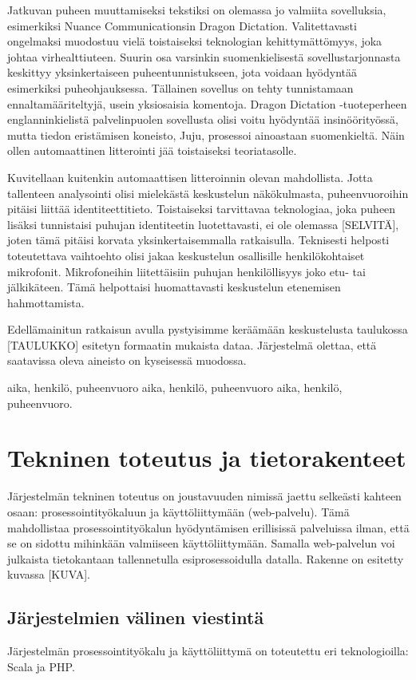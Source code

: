 \documentclass[11pt,a4paper,oneside]{memoir}
\begin{document}
Jatkuvan puheen muuttamiseksi tekstiksi on olemassa jo valmiita sovelluksia, esimerkiksi Nuance Communicationsin Dragon Dictation. Valitettavasti ongelmaksi muodostuu vielä toistaiseksi teknologian kehittymättömyys, joka johtaa  virhealttiuteen. Suurin osa varsinkin suomenkielisestä sovellustarjonnasta keskittyy yksinkertaiseen puheentunnistukseen, jota voidaan hyödyntää esimerkiksi puheohjauksessa. Tällainen sovellus on tehty tunnistamaan ennaltamääriteltyjä, usein yksiosaisia komentoja. Dragon Dictation -tuoteperheen englanninkielistä palvelinpuolen sovellusta olisi voitu hyödyntää insinöörityössä, mutta tiedon eristämisen koneisto, Juju, prosessoi ainoastaan suomenkieltä. Näin ollen automaattinen litterointi jää toistaiseksi teoriatasolle.

Kuvitellaan kuitenkin automaattisen litteroinnin olevan mahdollista. Jotta tallenteen analysointi olisi mielekästä keskustelun näkökulmasta, puheenvuoroihin pitäisi liittää identiteettitieto. Toistaiseksi tarvittavaa teknologiaa, joka puheen lisäksi tunnistaisi puhujan identiteetin luotettavasti, ei ole olemassa [SELVITÄ], joten tämä pitäisi korvata yksinkertaisemmalla ratkaisulla. Teknisesti helposti toteutettava vaihtoehto olisi jakaa keskustelun osallisille henkilökohtaiset mikrofonit. Mikrofoneihin liitettäisiin puhujan henkilöllisyys joko etu- tai jälkikäteen. Tämä helpottaisi huomattavasti keskustelun etenemisen hahmottamista.

Edellämainitun ratkaisun avulla pystyisimme keräämään keskustelusta taulukossa [TAULUKKO] esitetyn formaatin mukaista dataa. Järjestelmä olettaa, että saatavissa oleva aineisto on kyseisessä muodossa.

aika, henkilö, puheenvuoro
aika, henkilö, puheenvuoro
aika, henkilö, puheenvuoro.

\chapter{Tekninen toteutus ja tietorakenteet}
Järjestelmän tekninen toteutus on joustavuuden nimissä jaettu selkeästi kahteen osaan: prosessointityökaluun ja käyttöliittymään (web-palvelu). Tämä mahdollistaa prosessointityökalun hyödyntämisen erillisissä palveluissa ilman, että se on sidottu mihinkään valmiiseen käyttöliittymään. Samalla web-palvelun voi julkaista tietokantaan tallennetulla esiprosessoidulla datalla. Rakenne on esitetty kuvassa [KUVA].

\section{Järjestelmien välinen viestintä}
Järjestelmän prosessointityökalu ja käyttöliittymä on toteutettu eri teknologioilla: Scala ja PHP.
\end{document}
